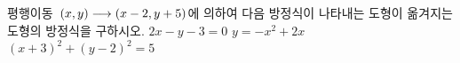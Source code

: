 평행이동~$(x{,}\mkern3mu\mathopen{}y)\longrightarrow(x-2{,}\mkern3mu\mathopen{}y+5)$에 의하여 다음 방정식이 나타내는 도형이 옮겨지는 도형의 방정식을 구하시오.
 $2x-y-3=0$
 $y=-x^2+2x$
 $(x+3)^2+(y-2)^2=5$
